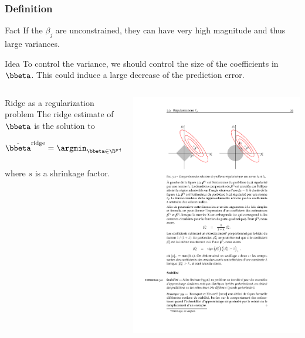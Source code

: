 \documentclass{beamer}\usepackage[]{graphicx}\usepackage[]{color}
\begin{document}
\begin{frame}
  \frametitle{Definition}

  \begin{block}{Fact}
    If  the  $\beta_j$ are  unconstrained,  they  can  have very  high
    magnitude and thus large variances.
  \end{block}

  \begin{block}{Idea}
    To  control  the variance,  we  should  control  the size  of  the
    coefficients in  $\bbeta$. This could  induce a large  decrease of
    the prediction error.
  \end{block}

  \begin{overlayarea}{\textwidth}{.4\textheight}
    \begin{columns}
      \begin{column}[c]{.6\textwidth}
        \begin{block}{Ridge as a regularization problem}
          The ridge estimate of $\bbeta$ is the solution to
          \begin{equation*}
            \hat{\bbeta}^{\text{ridge}}     =    \argmin_{\bbeta\in\R^{p+1}}
            \mathrm{RSS}(\bbeta), \quad  \text{s.t. } \sum_{j=1}^p \beta_j^2
            \leq s,
          \end{equation*}
          where $s$ is a shrinkage factor.
        \end{block}
      \end{column}
      \begin{column}{.4\textwidth}
        \includegraphics[width=.7\textwidth]{figures/ridge_set}
      \end{column}
    \end{columns}
  \end{overlayarea}
\end{frame}
\end{document}

